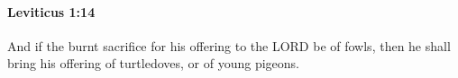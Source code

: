
		\paragraph{Leviticus 1:14} %
			\label{LEVITICUS-1-14}

			And if the burnt sacrifice for his offering to the LORD be of fowls, then he shall bring his offering of turtledoves, or of young pigeons.


